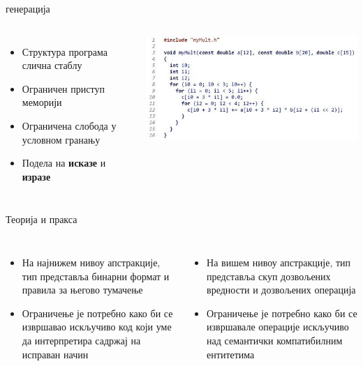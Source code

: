 \documentclass[xcolor=table]{beamer}
\begin{document}
    \begin{frame}{ генерација}
        \begin{columns}
            \begin{itemize}
                \item Структура програма слична стаблу
                \item Ограничен приступ меморији
                \item Ограничена слобода у условном гранању
                \item Подела на \textbf{исказе} и \textbf{изразе}
            \end{itemize}
            
            \centering
            \includegraphics[width=0.7\textheight,keepaspectratio]{images/c.jpg}
        \end{columns}
    \end{frame}
    
    \begin{frame}{Теорија и пракса}
        \begin{columns}
            \begin{itemize}
                \item На најнижем нивоу апстракције, тип представља бинарни формат и правила за његово тумачење
                \item Ограничење је потребно како би се извршавао искључиво код који уме да интерпретира садржај на исправан начин
            \end{itemize}
            
            \begin{itemize}
                \item На вишем нивоу апстракције, тип представља скуп дозвољених вредности и дозвољених операција
                \item Ограничење је потребно како би се извршавале операције искључиво над семантички компатибилним ентитетима
            \end{itemize}
        \end{columns}
    \end{frame}
    
\end{document}
